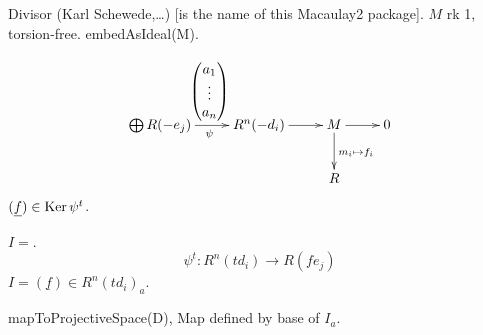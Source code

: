 \medskip\noindent
Divisor (Karl Schewede,…) [is the name of
this Macaulay2 package].
$M$ rk 1, torsion-free. embedAsIdeal(M).

$$
\xymatrix{
\bigoplus R(-e_j)
\ar[r]^{
\begin{pmatrix} a_1\\
\vdots \\
a_n \end{pmatrix} }_\psi
&  R^n(-d_i)
\ar[r]
& M\ar[d]^{m_i \mapsto  f_i}\ar[r]& 0\\
& & R
}
$$
$(\underline{f}) \in \mathop{\mathrm{Ker}} \psi^t$.

$I=$.
$$
\psi^t:R^n(td_i) \to R(fe_j)
$$
$I=(\underline{f}) \in R^n(td_i)_a$.

mapToProjectiveSpace(D),
Map defined by base of $I_a$.










